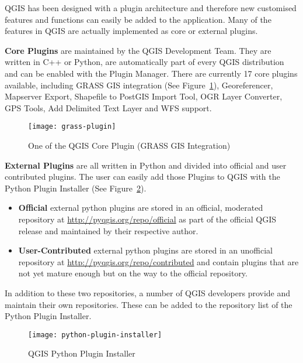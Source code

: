 QGIS has been designed with a plugin architecture and therefore new
customised features and functions can easily be added to the application.
Many of the features in QGIS are actually implemented as core or external
plugins. 

\textbf{Core Plugins} are maintained by the QGIS Development Team. They are
written in C++ or Python, are automatically part of every QGIS distribution
and can be enabled with the Plugin Manager. There are currently 17 core
plugins available, including GRASS GIS integration (See
Figure~\ref{fig:grass-plugin}), Georeferencer, Mapserver Export, Shapefile to
PostGIS Import Tool, OGR Layer Converter, GPS Tools, Add Delimited Text Layer
and WFS support.

\begin{figure}[h]
   \begin{center}
   \caption{One of the QGIS Core Plugin (GRASS GIS Integration)}
    \label{fig:grass-plugin}\smallskip
   \texttt{[image: grass-plugin]}
\end{center}
\end{figure}

\textbf{External Plugins} are all written in Python and divided into official
and user contributed plugins. The user can easily add those Plugins to QGIS
with the Python Plugin Installer (See Figure~\ref{fig:python-plugin}).

\begin{itemize}
\item \textbf{Official} external python plugins are stored in an official,
moderated repository at \url{http://pyqgis.org/repo/official} as part of the
official QGIS release and maintained by their respective author.
\item \textbf{User-Contributed} external python plugins are stored in an
unofficial repository at \url{http://pyqgis.org/repo/contributed} and contain
plugins that are not yet mature enough but on the way to the official
repository.
\end{itemize}

In addition to these two repositories, a number of QGIS developers provide and maintain
their own repositories. These can be added to the repository list of the
Python Plugin Installer.

\begin{figure}[h]
   \begin{center}
   \caption{QGIS Python Plugin Installer}\label{fig:python-plugin}\smallskip
   \texttt{[image: python-plugin-installer]}
\end{center}
\end{figure}

